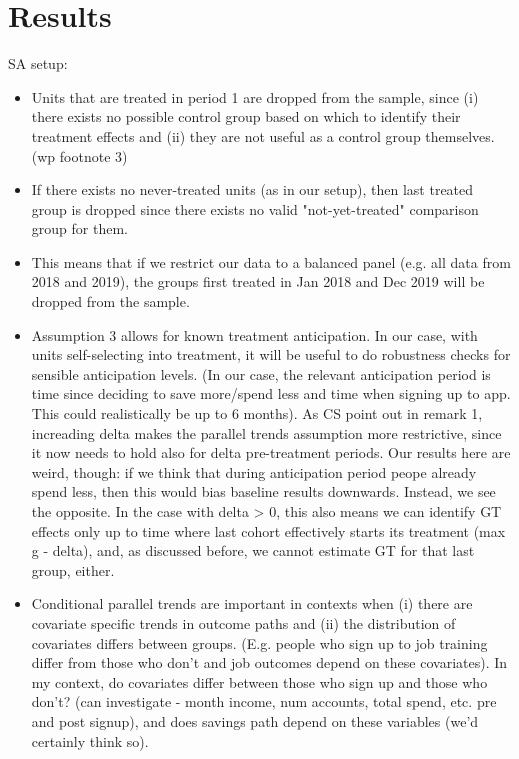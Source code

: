 
\section{Results}%
\label{sec:results}

SA setup:
\begin{itemize}
    \item Units that are treated in period 1 are dropped from the sample, since
        (i) there exists no possible control group based on which to identify
        their treatment effects and (ii) they are not useful as a control group
        themselves. (wp footnote 3)

    \item If there exists no never-treated units (as in our setup), then last
        treated group is dropped since there exists no valid "not-yet-treated"
        comparison group for them.

    \item This means that if we restrict our data to a balanced panel (e.g. all
        data from 2018 and 2019), the groups first treated in Jan 2018 and Dec
        2019 will be dropped from the sample.

    \item Assumption 3 allows for known treatment anticipation. In our case,
        with units self-selecting into treatment, it will be useful to do
        robustness checks for sensible anticipation levels. (In our case, the
        relevant anticipation period is time since deciding to save more/spend
        less and time when signing up to app. This could realistically be up to
        6 months). As CS point out in remark 1, increading delta makes
        the parallel trends assumption more restrictive, since it now needs to
        hold also for delta pre-treatment periods.
        Our results here are weird, though: if we think that during
        anticipation period peope already spend less, then this would bias
        baseline results downwards. Instead, we see the opposite. In the case
        with delta > 0, this also means we can identify GT effects only up to
        time where last cohort effectively starts its treatment (max g -
        delta), and, as discussed before, we cannot estimate GT for that last
        group, either.

    \item Conditional parallel trends are important in contexts when (i) there
        are covariate specific trends in outcome paths and (ii) the
        distribution of covariates differs between groups. (E.g. people who
        sign up to job training differ from those who don't and job outcomes
        depend on these covariates). In my context, do covariates differ
        between those who sign up and those who don't? (can investigate - month
        income, num accounts, total spend, etc. pre and post signup), and does
        savings path depend on these variables (we'd certainly think so).


\end{itemize}
